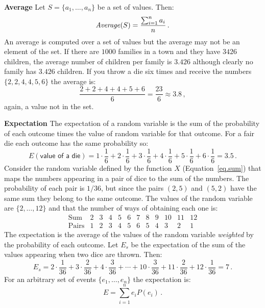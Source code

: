 \textbf{Average}
Let $S=\{a_1,\ldots,a_n\}$ be a set of values. Then:
\[
\mathit{Average}(S)=\displaystyle\frac{\sum_{i=1}^{n} a_i}{n}\,.
\]
An average is computed over a set of values but the average may not be an element of the set. If there are $1000$ families in a town and they have $3426$ children, the average number of children per family is $3.426$ although clearly no family has $3.426$ children. If you throw a die six times and receive the numbers $\{2,2,4,4,5,6\}$ the average is:
\[
\frac{2+2+4+4+5+6}{6}=\frac{23}{6}\approx 3.8\,,
\]
again, a value not in the set.

\textbf{Expectation}
The expectation of a random variable is the sum of the probability of each outcome times the value of random variable for that outcome. For a fair die each outcome has the same probability so:
\[
E(\textsf{value of a die})=1\cdot \frac{1}{6} + 2\cdot\frac{1}{6} + 3\cdot\frac{1}{6} + 4\cdot\frac{1}{6} + 5\cdot\frac{1}{6} + 6\cdot\frac{1}{6}=3.5\,.
\]
Consider the random variable defined by the function $X$ (Equation~\ref{eq.sum}) that maps the numbers appearing in a pair of dice to the sum of the numbers. The probability of each pair is $1/36$, but since the pairs $(2,5)$ and $(5,2)$ have the same sum they belong to the same outcome. The values of the random variable are $\{2,\ldots,12\}$ and that the number of ways of obtaining each one is:
\[
\begin{array}{l|rrrrrrrrrrr}
\textrm{Sum} & 2 & 3 & 4 & 5 & 6 & 7 & 8 & 9 & 10 & 11 & 12\\\hline
\textrm{Pairs} & 1 & 2 & 3 & 4 & 5 & 6 & 5 & 4 & 3 & 2 & 1
\end{array}
\]
The expectation is the average of the values of the random variable \emph{weighted} by the probability of each outcome. Let $E_s$ be the expectation of the sum of the values appearing when two dice are thrown. Then:
\begin{equation}\label{eq.two-dice}
E_s=2\cdot \frac{1}{36} + 3\cdot \frac{2}{36} + 4\cdot \frac{3}{36} + 
\cdots + 10\cdot \frac{3}{36} + 11\cdot \frac{2}{36} + 12\cdot \frac{1}{36} = 7\,.
\end{equation}
For an arbitrary set of events $\{e_1,\ldots,e_n\}$ the expectation is:
\[
E=\sum_{i=1}^{n} e_iP(e_i)\,.
\]

